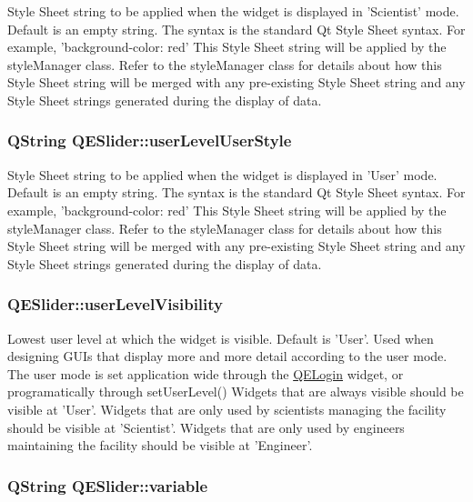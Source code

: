 \label{classQESlider_a352f3029807d1a093bb471c8db7aaf41}
Style Sheet string to be applied when the widget is displayed in 'Scientist' mode. Default is an empty string. The syntax is the standard Qt Style Sheet syntax. For example, 'background-\/color: red' This Style Sheet string will be applied by the styleManager class. Refer to the styleManager class for details about how this Style Sheet string will be merged with any pre-\/existing Style Sheet string and any Style Sheet strings generated during the display of data. \hypertarget{classQESlider_a6bceb6caaac935a3c91363e0ae2e0d4a}{
\subsubsection[{userLevelUserStyle}]{\setlength{\rightskip}{0pt plus 5cm}QString QESlider::userLevelUserStyle}}
\label{classQESlider_a6bceb6caaac935a3c91363e0ae2e0d4a}
Style Sheet string to be applied when the widget is displayed in 'User' mode. Default is an empty string. The syntax is the standard Qt Style Sheet syntax. For example, 'background-\/color: red' This Style Sheet string will be applied by the styleManager class. Refer to the styleManager class for details about how this Style Sheet string will be merged with any pre-\/existing Style Sheet string and any Style Sheet strings generated during the display of data. \hypertarget{classQESlider_a6aea2f373a3b07597dd8db1dcb2803cc}{
\subsubsection[{userLevelVisibility}]{ QESlider::userLevelVisibility}}
\label{classQESlider_a6aea2f373a3b07597dd8db1dcb2803cc}
Lowest user level at which the widget is visible. Default is 'User'. Used when designing GUIs that display more and more detail according to the user mode. The user mode is set application wide through the \hyperlink{classQELogin}{QELogin} widget, or programatically through setUserLevel() Widgets that are always visible should be visible at 'User'. Widgets that are only used by scientists managing the facility should be visible at 'Scientist'. Widgets that are only used by engineers maintaining the facility should be visible at 'Engineer'. \hypertarget{classQESlider_a05487f9ab40b5e702c667d9f5f85ed11}{
\subsubsection[{variable}]{\setlength{\rightskip}{0pt plus 5cm}QString QESlider::variable}}
